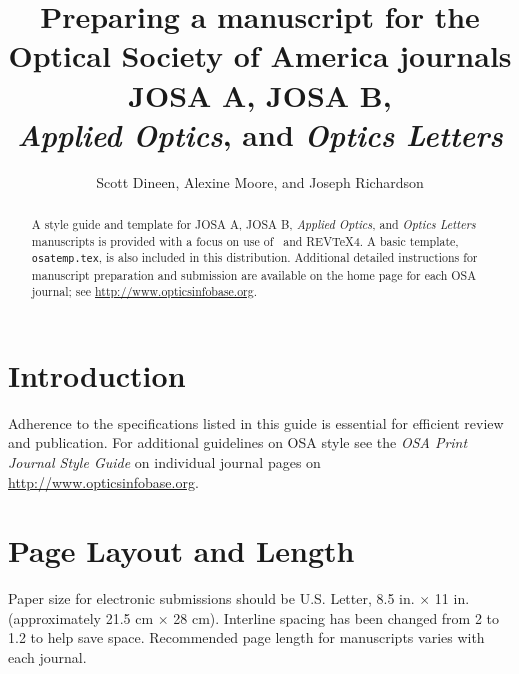 \documentclass[letterpaper,12pt]{article}   %
\begin{document}
\title{Preparing a manuscript
for the Optical Society of America journals JOSA A, JOSA B, \\
\textit{Applied Optics}, and \textit{Optics Letters}}

\author{Scott Dineen, Alexine Moore, and Joseph Richardson}

\address{Optical Society of America, 2010 Massachusetts Avenue, NW, \\
Washington, D.C. 20036} %


\begin{abstract}A style guide and template for JOSA A, JOSA B,
\textit{Applied Optics}, and \textit{Optics Letters} manuscripts
is provided with a focus on use of \LaTeXe\ and REV\TeX{}4. A
basic template, \texttt{osatemp.tex}, is also included in this
distribution. Additional detailed instructions for manuscript
preparation and submission are available on the home page for each
OSA journal; see \mbox{\href{http://www.opticsinfobase.org}{http://www.opticsinfobase.org}}. \\
\end{abstract}


\maketitle %

\section{Introduction}
Adherence to the specifications listed in this guide is essential
for efficient review and publication. For additional guidelines on OSA style see the 
\textit{OSA Print Journal Style Guide} on individual journal pages on  
\mbox{\href{http://www.opticsinfobase.org}{http://www.opticsinfobase.org}}.


\section{Page Layout and Length}
Paper size for electronic submissions should be U.S. Letter, 8.5
in. $\times$ 11 in. (approximately 21.5 cm $\times$ 28 cm). 
Interline spacing has been changed from 2 to 1.2 to help save space. Recommended page length for manuscripts varies with each journal. 
\end{document}
